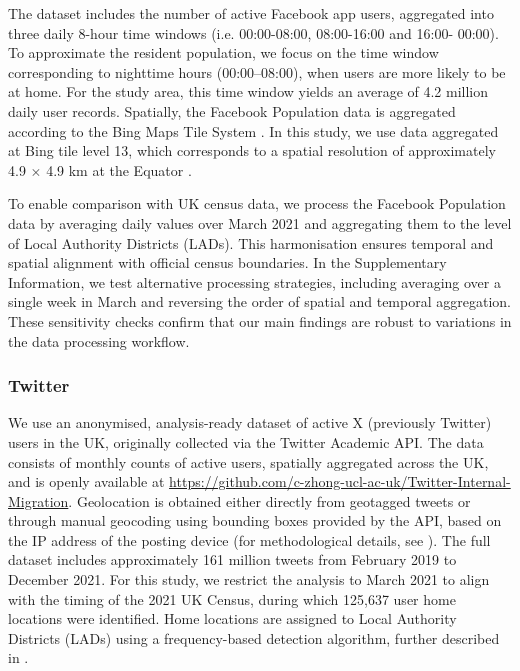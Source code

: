 \documentclass[]{rsos}%
\begin{document}
The dataset includes the number of
active Facebook app users, aggregated into three daily 8-hour time windows (i.e.
00:00-08:00, 08:00-16:00 and 16:00- 00:00). To approximate the resident population, we focus on the time window corresponding to nighttime hours (00:00--08:00), when users are more likely to be at home. For the study area, this time window yields an average of 4.2 million daily user records. Spatially, the Facebook Population data is aggregated according to the Bing Maps Tile System \citep{bingmaps_tile_system}. In this study, we use data aggregated at Bing tile level 13, which corresponds to a spatial resolution of approximately 4.9 \(\times\) 4.9 km at the Equator \citep{maas2019}.

To enable comparison with UK census data, we process the Facebook Population data by averaging daily values over March 2021 and aggregating them to the level of Local Authority Districts (LADs). This harmonisation ensures temporal and spatial alignment with official census boundaries. In the Supplementary Information, we test alternative processing strategies, including averaging over a single week in March and reversing the order of spatial and temporal aggregation. These sensitivity checks confirm that our main findings are robust to variations in the data processing workflow.

\subsubsection{Twitter}\label{twitter}

We use an anonymised, analysis-ready dataset of active
X (previously Twitter) users in the UK, originally collected via the Twitter Academic API. The data consists of monthly counts of active users, spatially aggregated across the UK, and is openly available at \url{https://github.com/c-zhong-ucl-ac-uk/Twitter-Internal-Migration}. Geolocation is obtained either directly from geotagged tweets or through manual geocoding using bounding boxes provided by the API, based on the IP address of the posting device (for methodological details, see \citep{wang2022}). The full dataset includes approximately 161 million tweets from
February 2019 to December 2021. For this study, we restrict the analysis to March 2021 to align with the timing of the 2021 UK Census, during which 125,637 user home locations were identified. Home locations are assigned to Local Authority Districts (LADs) using a frequency-based detection algorithm, further described in \citep{wang2022}.
\end{document}
